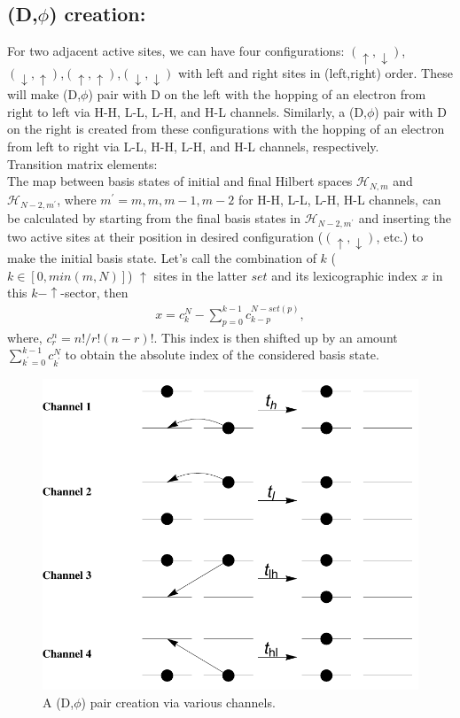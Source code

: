 \documentclass[a4paper,twocolumn]{revtex4-1} %
\newcommand{\da}{\downarrow}
\newcommand{\ua}{\uparrow}
\begin{document}
\subsection{(D,$\phi$) creation: }
For two adjacent active sites,
we can have four configurations:
$(\ua,\da)$, $(\da,\ua)$,$(\ua,\ua)$,$(\da,\da)$ with left and right sites in (left,right) order.
These will make (D,$\phi$) pair with D on the left 
with the hopping of an electron from right to left 
via H-H, L-L, L-H, and H-L channels.
Similarly,
a (D,$\phi$) pair with D on the right is created from these configurations
with the hopping of an electron from left to right
via L-L, H-H, L-H, and H-L channels, respectively.
\\Transition matrix elements:\\
The map between basis states of initial and final Hilbert spaces
$\mathcal{H}_{N,m}$ and $\mathcal{H}_{N-2,m^\prime}$, 
where $m^\prime=m,m,m-1,m-2$ for H-H, L-L, L-H, H-L channels,
can be calculated by starting from the final basis states in $\mathcal{H}_{N-2,m^\prime}$ 
and inserting the two active sites
at their position in desired configuration ($(\ua,\da)$, etc.) to make the initial basis state.
Let's call the combination of $k$ ($k\in [0,min(m,N)]$) $\ua$ sites in the latter $set$ and its lexicographic index
$x$ in this $k-\ua$-sector, then
\begin{eqnarray*}
x = c^N_ k - 
   \sum_{p=0}^{k-1}c^{N - set(p)}_{ k - p},
\end{eqnarray*}  
 where, $c^n_r = {n!}/{r!(n-r)!}$.
  This index is then shifted up by an amount 
$\sum_{k^\prime=0}^{k-1} c^N_{k^\prime}$ to obtain the absolute index of the considered basis state.

\begin{figure}[htpb]
  \centering
  \includegraphics[width=0.4\columnwidth]{DPhiCreation}
   \caption{A (D,$\phi$) pair creation via various channels.
 \label{fig:phihops}}  
\end{figure}
\end{document}
